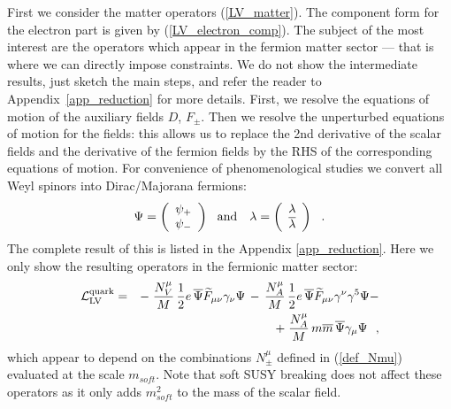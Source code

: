 \documentclass[12pt]{revtex4}
\begin{document}
First we consider the matter operators (\ref{LV_matter}).
The component form for the electron part is given by 
(\ref{LV_electron_comp}).
        The subject of the most interest are the operators which appear in 
the fermion matter sector --- 
that is where we can directly impose constraints.
We do not show the intermediate results, just sketch
the main steps, and refer the reader to Appendix~\ref{app_reduction} 
for more details.
First, we resolve the equations of motion of the auxiliary
fields $ D $, $ F_\pm $. 
Then we resolve the unperturbed equations of motion for the
fields: this allows us to replace the 2nd derivative of
the scalar fields and the derivative of the fermion fields
by the RHS of the corresponding equations of motion.
For convenience of phenomenological studies we convert
all Weyl spinors into Dirac/Majorana fermions:
\begin{equation}
\label{Dirac_spinors}
   \Psi = \left ( 
                 \begin{array}{c}
                    \psi_+ \\
                    \psi_-
                 \end{array}
          \right ) ~~  {\rm and} ~~~ 
   \lambda = \left (
                 \begin{array}{c}
                    \lambda \\
                    \overline{\lambda}
                 \end{array}
             \right ) ~~.
\end{equation}
The complete result of this is listed in the Appendix 
\ref{app_reduction}.
        Here we only show the resulting operators in the 
fermionic matter sector:
\begin{eqnarray}
\nonumber
   \mathcal{L}_{\rm LV}^{\rm quark} & = &
	-\;
       \frac{N_V^\mu}
              {M} \, \frac{1}{2}e \,
       \overline{\Psi} \widetilde{F}_{\mu\nu}
                       \gamma_\nu \Psi 
     \,-\, 
	\frac{N_A^\mu}
              {M} \, \frac{1}{2}e \,
       \overline{\Psi} \widetilde{F}_{\mu\nu}
                       \gamma^\nu \gamma^5 \Psi - \\
\label{resolved_LV_Dirac}
     && +\;  \frac{N_A^\mu}
                  {M}   \,m \overline{m}\, \overline{\Psi} \gamma_\mu \Psi
     ~~,
\end{eqnarray}
which appear to depend on the combinations 
$ N_\pm^\mu $
defined in (\ref{def_Nmu}) evaluated at the 
scale $ m_{soft} $.
Note that soft SUSY breaking does not affect these operators
as it only adds $ m_{soft}^2 $ to the mass of the scalar field.
\end{document}
